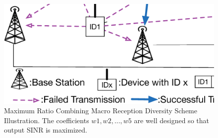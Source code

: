 \begin{figure}[!ht]
	\centering
	\includegraphics[width=\linewidth]{Chapter5/Figures/MRC_Type_Macro_Diversity_Recpetion_Illustration}
	\caption{Maximum Ratio Combining Macro Reception Diversity Scheme Illustration. The coefficients $w1, w2, ..., w5$ are well designed so that output SINR is maximized.}
	\label{fig:mrc_macro_diversity_recpetion_illustration}
\end{figure} 



